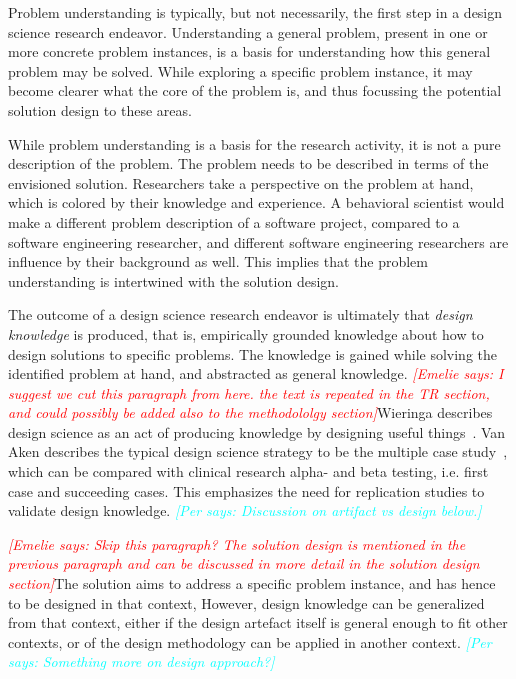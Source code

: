 \documentclass[graybox]{svmult}
\newcommand{\emelie}[1]{\textcolor{red}{{\it [Emelie says: #1]}}}
\newcommand{\per}[1]{\textcolor{cyan}{{\it [Per says: #1]}}}
\newcommand{\emelie}[1]{}
\newcommand{\per}[1]{}
\begin{document}
Problem understanding is typically, but not necessarily, the first step in a design science research endeavor. %
Understanding a general problem, present in one or more concrete problem instances, is a basis for understanding how this general problem may be solved.  While exploring a specific problem instance,   it may become clearer what the core of the problem is, and thus focussing the potential solution design to these areas. 

While problem understanding is a basis for the research activity, it is not a pure description of the problem. The problem needs to be described in terms of the envisioned solution. Researchers take a perspective on the problem at hand, which is colored by their knowledge and experience. A behavioral scientist would make a different problem description of a software project, compared to a software engineering researcher, and different software engineering researchers are influence by their background as well. This implies that the problem understanding is intertwined with the solution design.

The outcome of a design science research endeavor is ultimately that \emph{design knowledge} is produced, that is, empirically grounded knowledge about how to design solutions to specific problems. The knowledge is gained while solving the identified problem at hand, and abstracted as general knowledge. \emelie{I suggest we cut this paragraph from here. the text is repeated in the TR section, and could possibly be added also to the methodololgy section}Wieringa describes design science as an act of producing knowledge by designing useful things~\cite{wieringa_design_2009}.  Van Aken describes the typical design science strategy to be the multiple case study~\cite{van_aken_management_2004}, which can be compared with clinical research alpha- and beta testing, i.e. first case and succeeding cases. This emphasizes the need for replication studies to validate design knowledge. \per{Discussion on artifact vs design below.}

\emelie{Skip this paragraph? The solution design is mentioned in the previous paragraph and can be discussed in more detail in the solution design section}The solution aims to address a specific problem instance, and has hence to be designed in that context, However, design knowledge can be generalized from that context, either if the design artefact itself is general enough to fit other contexts, or of the design methodology can be applied in another context.
\per{Something more on design approach?}
\end{document}
